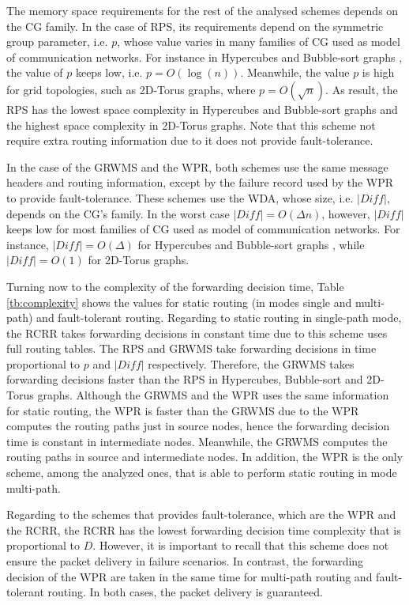 The memory space requirements for the rest of the analysed schemes depends on the CG family. In the case of RPS, its requirements depend on the symmetric group parameter, i.e. $p$, whose value varies in many families of CG used as model of communication networks. For instance in  Hypercubes and Bubble-sort graphs \cite{hyp_but}, the value of $p$ keeps low, i.e.  $p=O(\log(n))$. Meanwhile, the value $p$ is high for grid topologies, such as 2D-Torus graphs, where $p=O(\sqrt{n})$. As result, the RPS has the lowest space complexity in Hypercubes and Bubble-sort graphs and the highest space complexity in 2D-Torus graphs. Note that this scheme not require extra routing information due  to it does not provide fault-tolerance. 

In the case of the GRWMS and the WPR, both schemes use the same message headers and routing information, except by the failure record used by the WPR to provide fault-tolerance. These schemes use the WDA, whose size, i.e. $|Diff|$, depends on the CG's family. In the worst case $|Diff|= O( \Delta n)$, however, $|Diff|$ keeps low for most families of CG used as model of communication networks. For instance, $| Diff | = O( \Delta)$ for Hypercubes and Bubble-sort graphs \cite{hyp_but}, while $| Diff | = O(1)$ for 2D-Torus graphs.

Turning now to the complexity of the forwarding decision time, Table \ref{tb:complexity} shows the values for static routing (in modes single and multi-path) and fault-tolerant routing. Regarding to static routing in single-path mode, the RCRR takes forwarding decisions in constant time due to this scheme uses full routing tables. The RPS and GRWMS take forwarding decisions in time proportional to $p$ and $|Diff|$ respectively. Therefore, the GRWMS takes forwarding decisions faster than the RPS in Hypercubes, Bubble-sort and 2D-Torus graphs.
Although the GRWMS and the WPR uses the same information for static routing, the WPR is faster than the GRWMS due to the WPR computes the routing paths just in source nodes, hence the forwarding decision time is constant in intermediate nodes. Meanwhile, the GRWMS computes the routing paths in source and intermediate nodes. In addition, the WPR is the only scheme, among the analyzed ones, that is able to perform static routing in mode multi-path.

Regarding to the schemes that provides fault-tolerance, which are the WPR and the RCRR, the RCRR has the lowest forwarding decision time complexity that is proportional to $D$. However, it is important to recall that this scheme does not ensure the packet delivery in failure scenarios. In contrast, the forwarding decision of the WPR are taken in the same time for multi-path routing and fault-tolerant routing. In both cases, the packet delivery is guaranteed.